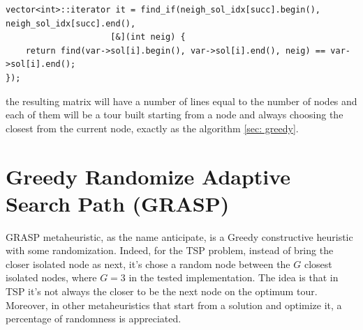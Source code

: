 \begin{lstlisting}
vector<int>::iterator it = find_if(neigh_sol_idx[succ].begin(), neigh_sol_idx[succ].end(),
					 [&](int neig) {
	return find(var->sol[i].begin(), var->sol[i].end(), neig) == var->sol[i].end();
});
\end{lstlisting}

the resulting matrix will have a number of lines equal to the number of nodes and each of them will be a tour built starting from a node and always choosing the closest from the current node, exactly as the algorithm \ref{sec: greedy}.

\section{Greedy Randomize Adaptive Search Path (GRASP)}
GRASP metaheuristic, as the name anticipate, is a Greedy constructive heuristic with some randomization. Indeed, for the TSP problem, instead of bring the closer isolated node as next, it's chose a random node between the $ G $ closest isolated nodes, where $ G = 3 $ in the tested implementation.
The idea is that in TSP it's not always the closer to be the next node on the optimum tour. Moreover, in other metaheuristics that start from a solution and optimize it, a percentage of randomness is appreciated.

